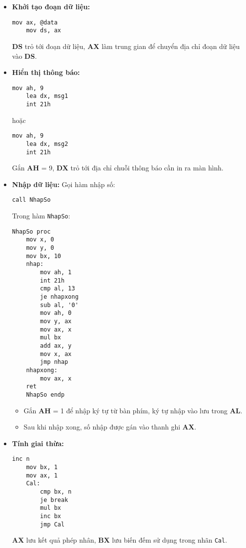 \begin{itemize}
    \item \textbf{Khởi tạo đoạn dữ liệu:}
    \begin{lstlisting}[style=asm]
    mov ax, @data
    mov ds, ax  
    \end{lstlisting}
    \textbf{DS} trỏ tới đoạn dữ liệu, \textbf{AX} làm trung gian để chuyển địa chỉ đoạn dữ liệu vào \textbf{DS}.

    \item \textbf{Hiển thị thông báo:}
    \begin{lstlisting}[style=asm]
    mov ah, 9              
    lea dx, msg1
    int 21h
    \end{lstlisting}
    hoặc
    \begin{lstlisting}[style=asm]
    mov ah, 9              
    lea dx, msg2
    int 21h
    \end{lstlisting}
    Gắn \textbf{AH} = 9, \textbf{DX} trỏ tới địa chỉ chuỗi thông báo cần in ra màn hình.

    \item \textbf{Nhập dữ liệu:}
    Gọi hàm nhập số:
    \begin{lstlisting}[style=asm]
    call NhapSo 
    \end{lstlisting}
    Trong hàm \texttt{NhapSo}:
    \begin{lstlisting}[style=asm]
    NhapSo proc                
    mov x, 0               
    mov y, 0               
    mov bx, 10             
    nhap:   
        mov ah, 1         
        int 21h 
        cmp al, 13         
        je nhapxong
        sub al, '0'        
        mov ah, 0
        mov y, ax         
        mov ax, x
        mul bx            
        add ax, y       
        mov x, ax          
        jmp nhap        
    nhapxong:
        mov ax, x          
    ret
    NhapSo endp 
    \end{lstlisting}
    \begin{itemize}
        \item Gắn \textbf{AH} = 1 để nhập ký tự từ bàn phím, ký tự nhập vào lưu trong \textbf{AL}.
        \item Sau khi nhập xong, số nhập được gán vào thanh ghi \textbf{AX}.
    \end{itemize}

    \item \textbf{Tính giai thừa:}
    \begin{lstlisting}[style=asm]
    inc n                  
    mov bx, 1              
    mov ax, 1     
    Cal:
        cmp bx, n          
        je break           
        mul bx            
        inc bx           
        jmp Cal     
    \end{lstlisting}
    \textbf{AX} lưu kết quả phép nhân, \textbf{BX} lưu biến đếm sử dụng trong nhãn \texttt{Cal}.


\end{itemize}
